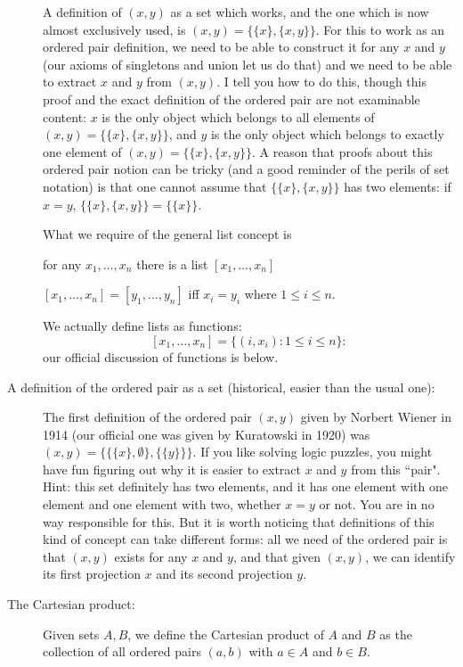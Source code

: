 \documentclass[12pt]{article}
\begin{document}
\begin{description}
A definition of $(x,y)$ as a set which works, and the one which is now almost exclusively used, is $(x,y) = \{\{x\},\{x,y\}\}$.  For this to work as an ordered pair definition, we
need to be able to construct it for any $x$ and $y$ (our axioms of singletons and union let us do that) and we need to be able to extract $x$ and $y$ from $(x,y)$.  I tell you how to do this, though this proof and the exact definition of the ordered pair are not examinable content:  $x$ is the only object which belongs to all  elements of $(x,y) = \{\{x\},\{x,y\}\}$, and
$y$ is the only object which belongs to exactly one element of $(x,y) = \{\{x\},\{x,y\}\}$.  A reason that proofs about this ordered pair notion can be tricky (and a good reminder of the perils of set notation) is that one cannot assume that $\{\{x\},\{x,y\}\}$ has two elements:  if $x=y$, $\{\{x\},\{x,y\}\}= \{\{x\}\}$.

What we require of the general list concept is

for any $x_1,\ldots,x_n$ there is a list $[x_1,\ldots,x_n]$

$[x_1,\ldots,x_n] = [y_1,\ldots,y_n]$ iff $x_i = y_i$ where $1 \leq i \leq n$.

We actually define lists as functions:  $$[x_1,\ldots,x_n] = \{(i,x_i):1 \leq i \leq n\}:$$ our official discussion of functions is below.

\item[A definition of the ordered pair as a set (historical, easier than the usual one):]

The first definition of the ordered pair $(x,y)$ given by Norbert Wiener in 1914 (our official one was given by Kuratowski in 1920) was $(x,y) = \{\{\{x\},\emptyset\},\{\{y\}\}\}$.  If you like solving logic puzzles, you might have fun figuring out why it is easier to extract $x$ and $y$ from this ``pair".  Hint:  this set definitely has two elements, and it has one element with one element and one element with two, whether $x=y$ or not.  You are in no way responsible for this.  But it is worth noticing that definitions of this kind of concept can take different forms:  all we need of the ordered pair is that $(x,y)$ exists for any $x$ and $y$, and that given $(x,y)$, we can identify its first projection $x$ and its second projection $y$.



\item[The Cartesian product:]

Given sets $A,B$, we define the Cartesian product of $A$ and $B$ as the collection of all ordered pairs
$(a,b)$ with $a \in A$ and $b \in B$.


\end{description}
\end{document}

